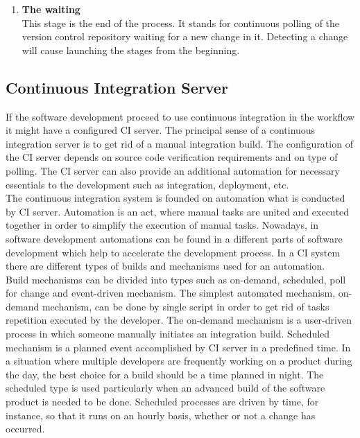 \begin{enumerate}
	\item \textbf{The waiting}\\[0.1em]
		  This stage is the end of the process. It stands for continuous polling of  the version control repository waiting for a new change in it. Detecting a change will cause launching the stages from the beginning.

\end{enumerate}

\subsection{Continuous Integration Server}

If the software development proceed to use continuous integration in the workflow it might have a configured CI server. The principal sense of a continuous integration server is to get rid of a manual integration build. The configuration of the CI server depends on source code verification requirements and on type of polling. The CI server can also provide an additional automation for necessary essentials to the development such as integration, deployment, etc.\\

The continuous integration system is founded on automation what is conducted by CI server. Automation is an act, where manual tasks are united and executed together in order to simplify the execution of manual tasks. Nowadays, in software development automations can be found in a different parts of software development which help to accelerate the development process. In a CI system there are different types of builds and mechanisms used for an automation.\\

Build mechanisms can be divided into types such as on-demand, scheduled, poll for change and event-driven mechanism\cite{CIPD}. The simplest automated mechanism, on-demand mechanism, can be done by single script in order to get rid of tasks repetition executed by the developer. The on-demand mechanism is a user-driven process in which someone manually initiates an integration build\cite{CIPD}. Scheduled mechanism is a planned event accomplished by CI server in a predefined time. In a situation where multiple developers are frequently working on a product during the day, the best choice for a build should be a time planned in night. The scheduled type is used particularly when an advanced build of the software product is needed to be done. Scheduled processes are driven by time, for instance, so that it runs on an hourly basis, whether or not a change has occurred\cite{CIPD}.\\

